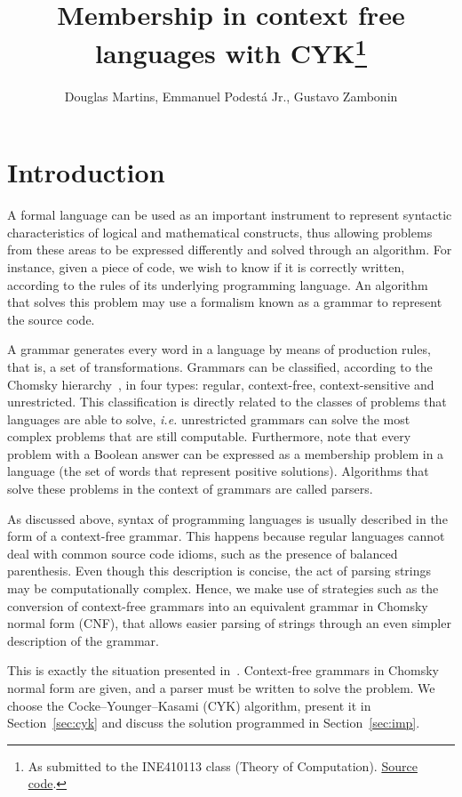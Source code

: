 \documentclass[12pt]{article}
\title{Membership in context free languages with CYK\footnote{
    As submitted to the INE410113 class (Theory of Computation). \href{https://github.com/zambonin/ine410113}{Source code}.}}
\author{Douglas Martins\inst{1}, Emmanuel Podestá Jr.\inst{1}, Gustavo Zambonin\inst{1}}
\begin{document}
 

\maketitle

\section{Introduction}\label{sec:intro}

A formal language can be used as an important instrument to represent syntactic characteristics of logical and mathematical constructs, thus allowing problems from these areas to be expressed differently and solved through an algorithm. For instance, given a piece of code, we wish to know if it is correctly written, according to the rules of its underlying programming language. An algorithm that solves this problem may use a formalism known as a grammar to represent the source code.

A grammar generates every word in a language by means of production rules, that is, a set of transformations. Grammars can be classified, according to the Chomsky hierarchy~\cite{}, in four types: regular, context-free, context-sensitive and unrestricted. This classification is directly related to the classes of problems that languages are able to solve, \emph{i.e.} unrestricted grammars can solve the most complex problems that are still computable. Furthermore, note that every problem with a Boolean answer can be expressed as a membership problem in a language (the set of words that represent positive solutions). Algorithms that solve these problems in the context of grammars are called parsers.

As discussed above, syntax of programming languages is usually described in the form of a context-free grammar. This happens because regular languages cannot deal with common source code idioms, such as the presence of balanced parenthesis. Even though this description is concise, the act of parsing strings may be computationally complex. Hence, we make use of strategies such as the conversion of context-free grammars into an equivalent grammar in Chomsky normal form (CNF), that allows easier parsing of strings through an even simpler description of the grammar.

This is exactly the situation presented in~\cite{}. Context-free grammars in Chomsky normal form are given, and a parser must be written to solve the problem. We choose the Cocke–Younger–Kasami (CYK) algorithm, present it in Section~\ref{sec:cyk} and discuss the solution programmed in Section~\ref{sec:imp}.
\end{document}
